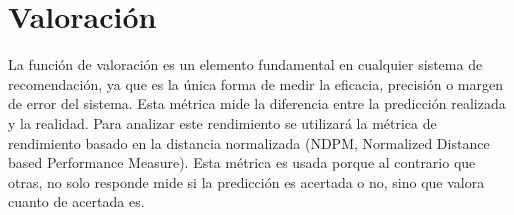 \section{Valoración} \label{Valoracion}
La función de valoración es un elemento fundamental en cualquier sistema de recomendación, ya que es la única forma de medir la eficacia, precisión o margen de error del sistema. Esta métrica mide la diferencia entre  la predicción realizada y la realidad. Para analizar este rendimiento se utilizará la métrica de rendimiento basado en la distancia normalizada (NDPM, Normalized Distance based Performance Measure). Esta métrica es usada porque al contrario que otras, no solo responde mide si la predicción es acertada o no, sino que valora cuanto de acertada es.


